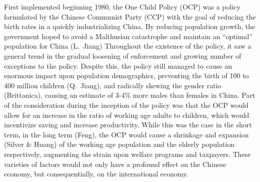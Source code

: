 \documentclass[12pt, a4paper, twoside]{article}
\begin{document}
\maketitle{}

First implemented beginning 1980, the One Child Policy (OCP) was a policy formulated by the Chinese Communist Party (CCP) with the goal of reducing the birth rates in a quickly industrializing China. By reducing population growth, the government hoped to avoid a Malthusian catastrophe and maintain an “optimal” population for China (L.\ Jiang) Throughout the existence of the policy, it saw a general trend in the gradual loosening of enforcement and growing number of exceptions to the policy. Despite this, the policy still managed to cause an enormous impact upon population demographics, preventing the birth of 100 to 400 million children (Q.\ Jiang), and radically skewing the gender ratio (Brittanica), causing an estimate of 3-4\% more males than females in China. Part of the consideration during the inception of the policy was that the OCP would allow for an increase in the ratio of working age adults to children, which would incentivize saving and increase productivity. While this was the case in the short term, in the long term (Feng), the OCP would cause a shrinkage and expansion (Silver \& Huang) of the working age population and the elderly population respectively, augmenting the strain upon welfare programs and taxpayers. These varieties of factors would not only have a profound effect on the Chinese economy, but consequentially, on the international economy. 
\end{document}
